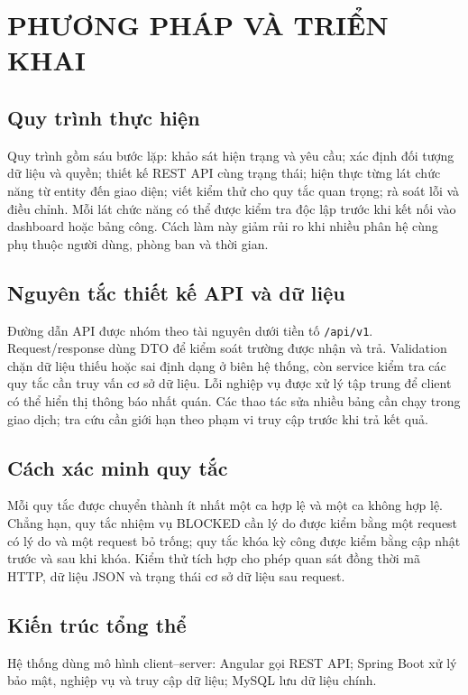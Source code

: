 \documentclass[12pt,a4paper,oneside]{report}
\newcommand{\code}[1]{\texttt{#1}}
\begin{document}
\chapter{PHƯƠNG PHÁP VÀ TRIỂN KHAI}
\section{Quy trình thực hiện}
Quy trình gồm sáu bước lặp: khảo sát hiện trạng và yêu cầu; xác định đối tượng dữ liệu và quyền; thiết kế REST API cùng trạng thái; hiện thực từng lát chức năng từ entity đến giao diện; viết kiểm thử cho quy tắc quan trọng; rà soát lỗi và điều chỉnh. Mỗi lát chức năng có thể được kiểm tra độc lập trước khi kết nối vào dashboard hoặc bảng công. Cách làm này giảm rủi ro khi nhiều phân hệ cùng phụ thuộc người dùng, phòng ban và thời gian.

\section{Nguyên tắc thiết kế API và dữ liệu}
Đường dẫn API được nhóm theo tài nguyên dưới tiền tố \code{/api/v1}. Request/response dùng DTO để kiểm soát trường được nhận và trả. Validation chặn dữ liệu thiếu hoặc sai định dạng ở biên hệ thống, còn service kiểm tra các quy tắc cần truy vấn cơ sở dữ liệu. Lỗi nghiệp vụ được xử lý tập trung để client có thể hiển thị thông báo nhất quán. Các thao tác sửa nhiều bảng cần chạy trong giao dịch; tra cứu cần giới hạn theo phạm vi truy cập trước khi trả kết quả.

\section{Cách xác minh quy tắc}
Mỗi quy tắc được chuyển thành ít nhất một ca hợp lệ và một ca không hợp lệ. Chẳng hạn, quy tắc nhiệm vụ BLOCKED cần lý do được kiểm bằng một request có lý do và một request bỏ trống; quy tắc khóa kỳ công được kiểm bằng cập nhật trước và sau khi khóa. Kiểm thử tích hợp cho phép quan sát đồng thời mã HTTP, dữ liệu JSON và trạng thái cơ sở dữ liệu sau request.
\section{Kiến trúc tổng thể}
Hệ thống dùng mô hình client--server: Angular gọi REST API; Spring Boot xử lý bảo mật, nghiệp vụ và truy cập dữ liệu; MySQL lưu dữ liệu chính.
\end{document}
